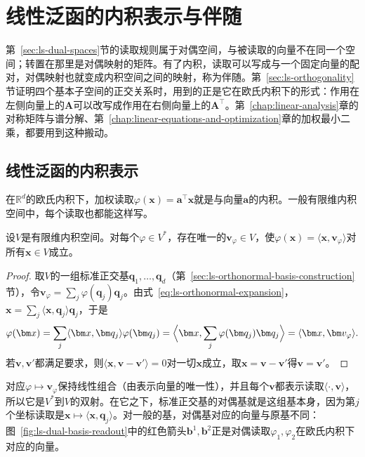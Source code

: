 \section{线性泛函的内积表示与伴随}
\label{sec:ls-adjoints}

第~\ref{sec:ls-dual-spaces}节的读取规则属于对偶空间，与被读取的向量不在同一个空间；转置在那里是对偶映射的矩阵。有了内积，读取可以写成与一个固定向量的配对，对偶映射也就变成内积空间之间的映射，称为伴随。第~\ref{sec:ls-orthogonality}节证明四个基本子空间的正交关系时，用到的正是它在欧氏内积下的形式：作用在左侧向量上的$\bm A$可以改写成作用在右侧向量上的$\bm A^\top$。第~\ref{chap:linear-analysis}章的对称矩阵与谱分解、第~\ref{chap:linear-equations-and-optimization}章的加权最小二乘，都要用到这种搬动。

\subsection{线性泛函的内积表示}
\label{sec:ls-riesz-representation}
在$\mathbb R^d$的欧氏内积下，加权读取$\varphi(\bm x)=\bm a^\top\bm x$就是与向量$\bm a$的内积。一般有限维内积空间中，每个读取也都能这样写。
\begin{theorem}[有限维Riesz表示定理]
\label{thm:ls-riesz-representation}
设$V$是有限维内积空间。对每个$\varphi\in V^*$，存在唯一的$\bm v_\varphi\in V$，使$\varphi(\bm x)=\langle\bm x,\bm v_\varphi\rangle$对所有$\bm x\in V$成立。
\end{theorem}
\begin{proof}
取$V$的一组标准正交基$\bm q_1,\ldots,\bm q_d$（第~\ref{sec:ls-orthonormal-basis-construction}节），令$\bm v_\varphi=\sum_j\varphi(\bm q_j)\bm q_j$。由式~\eqref{eq:ls-orthonormal-expansion}，$\bm x=\sum_j\langle\bm x,\bm q_j\rangle\bm q_j$，于是
\[
 \varphi(\bm x)=\sum_j\langle\bm x,\bm q_j\rangle\varphi(\bm q_j)=\Bigl\langle\bm x,\sum_j\varphi(\bm q_j)\bm q_j\Bigr\rangle=\langle\bm x,\bm v_\varphi\rangle.
\]
若$\bm v,\bm v'$都满足要求，则$\langle\bm x,\bm v-\bm v'\rangle=0$对一切$\bm x$成立，取$\bm x=\bm v-\bm v'$得$\bm v=\bm v'$。
\end{proof}
对应$\varphi\mapsto\bm v_\varphi$保持线性组合（由表示向量的唯一性），并且每个$\bm v$都表示读取$\langle\cdot,\bm v\rangle$，所以它是$V^*$到$V$的双射。在它之下，标准正交基的对偶基就是这组基本身，因为第$j$个坐标读取是$\bm x\mapsto\langle\bm x,\bm q_j\rangle$。对一般的基，对偶基对应的向量与原基不同：图~\ref{fig:ls-dual-basis-readout}中的红色箭头$\bm b^1,\bm b^2$正是对偶读取$\varphi_1,\varphi_2$在欧氏内积下对应的向量。

